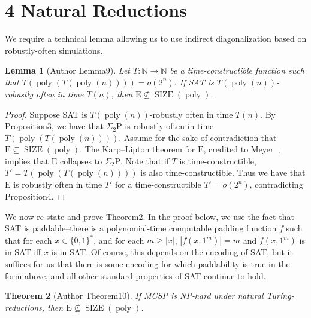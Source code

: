 \documentclass[10pt,a4paper]{article}
\newtheorem{nttheorem}{Theorem}
\newtheorem{ntlemma}[nttheorem]{Lemma}
\newcommand{\SIZE}{\operatorname{SIZE}}
\newcommand{\poly}{\operatorname{poly}}
\begin{document}
\section*{4 Natural Reductions}
We require a technical lemma allowing us to use indirect diagonalization based on robustly-often simulations.
\begin{ntlemma}[Author Lemma9]
Let $T:\mathbb N\to\mathbb N$ be a time-constructible function such that $T(\poly(T(\poly(n))))=o(2^n)$. If SAT is $T(\poly(n))$-robustly often in time $T(n)$, then $\mathrm E\not\subseteq\SIZE(\poly)$.
\end{ntlemma}
\begin{proof}
Suppose SAT is $T(\poly(n))$-robustly often in time $T(n)$. By Proposition3, we have that $\Sigma_2\mathrm P$ is robustly often in time $T(\poly(T(\poly(n))))$. Assume for the sake of contradiction that $\mathrm E\subseteq\SIZE(\poly)$. The Karp--Lipton theorem for $\mathrm E$, credited to Meyer~\cite{ref19}, implies that $\mathrm E$ collapses to $\Sigma_2\mathrm P$. Note that if $T$ is time-constructible, $T'=T(\poly(T(\poly(n))))$ is also time-constructible. Thus we have that $\mathrm E$ is robustly often in time $T'$ for a time-constructible $T'=o(2^n)$, contradicting Proposition4.
\end{proof}
We now re-state and prove Theorem2. In the proof below, we use the fact that SAT is paddable--there is a polynomial-time computable padding function $f$ such that for each $x\in\{0,1\}^*$, and for each $m\geq|x|$, $|f(x,1^m)|=m$ and $f(x,1^m)$ is in SAT iff $x$ is in SAT. Of course, this depends on the encoding of SAT, but it suffices for us that there is some encoding for which paddability is true in the form above, and all other standard properties of SAT continue to hold.
\begin{nttheorem}[Author Theorem10]
If MCSP is NP-hard under natural Turing-reductions, then $\mathrm E\not\subseteq\SIZE(\poly)$.
\end{nttheorem}
\end{document}
